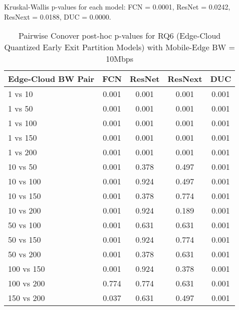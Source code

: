 \begin{table}[h]
\centering
\caption{Pairwise Conover post-hoc p-values for RQ6 (Edge-Cloud Quantized Early Exit Partition Models) with Mobile-Edge BW = 10Mbps}
\label{tab:conover_edge_cloud_quantized_earlyexit_partition_me10}
\smallskip
Kruskal-Wallis p-values for each model: FCN = 0.0001, ResNet = 0.0242, ResNext = 0.0188, DUC = 0.0000.

\begin{tabular}{lcccc}
\toprule
Edge-Cloud BW Pair & FCN & ResNet & ResNext & DUC \\
\midrule
1 vs 10 & 0.001 & 0.001 & 0.001 & 0.001 \\
1 vs 50 & 0.001 & 0.001 & 0.001 & 0.001 \\
1 vs 100 & 0.001 & 0.001 & 0.001 & 0.001 \\
1 vs 150 & 0.001 & 0.001 & 0.001 & 0.001 \\
1 vs 200 & 0.001 & 0.001 & 0.001 & 0.001 \\
10 vs 50 & 0.001 & 0.378 & 0.497 & 0.001 \\
10 vs 100 & 0.001 & 0.924 & 0.497 & 0.001 \\
10 vs 150 & 0.001 & 0.378 & 0.774 & 0.001 \\
10 vs 200 & 0.001 & 0.924 & 0.189 & 0.001 \\
50 vs 100 & 0.001 & 0.631 & 0.631 & 0.001 \\
50 vs 150 & 0.001 & 0.924 & 0.774 & 0.001 \\
50 vs 200 & 0.001 & 0.378 & 0.631 & 0.001 \\
100 vs 150 & 0.001 & 0.924 & 0.378 & 0.001 \\
100 vs 200 & 0.774 & 0.774 & 0.631 & 0.001 \\
150 vs 200 & 0.037 & 0.631 & 0.497 & 0.001 \\
\bottomrule
\end{tabular}
\end{table}

